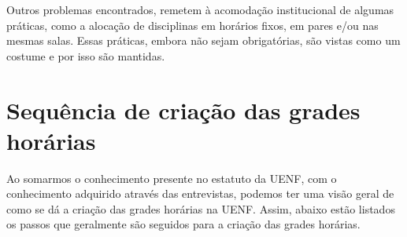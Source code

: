         Outros problemas encontrados, remetem à acomodação institucional de algumas práticas, como a alocação de disciplinas em horários fixos, em pares e/ou nas mesmas salas. Essas práticas, embora não sejam obrigatórias, são vistas como um costume e por isso são mantidas.

\section{Sequência de criação das grades horárias} %


    Ao somarmos o conhecimento presente no estatuto da UENF, com o conhecimento adquirido através das entrevistas, podemos ter uma visão geral de como se dá a criação das grades horárias na UENF. Assim, abaixo estão listados os passos que geralmente são seguidos para a criação das grades horárias.


